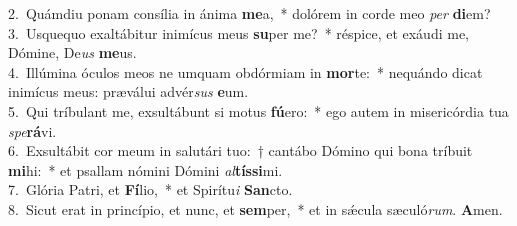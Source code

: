 {2.~}Quámdiu ponam consília in ánima \textbf{me}a,~* dolórem in corde meo \textit{per} \textbf{di}em?\\
{3.~}Usquequo exaltábitur inimícus meus \textbf{su}per me?~* réspice, et exáudi me, Dómine, De\textit{us} \textbf{me}us.\\
{4.~}Illúmina óculos meos ne umquam obdórmiam in \textbf{mor}te:~* nequándo dicat inimícus meus: præválui advér\textit{sus} \textbf{e}um.\\
{5.~}Qui tríbulant me, exsultábunt si motus \textbf{fú}ero:~* ego autem in misericórdia tua \textit{spe}\textbf{rá}vi.\\
{6.~}Exsultábit cor meum in salutári tuo:~† cantábo Dómino qui bona tríbuit \textbf{mi}hi:~* et psallam nómini Dómini \textit{al}\textbf{tís}\textbf{si}mi.\\
{7.~}Glória Patri, et \textbf{Fí}lio,~* et Spirítu\textit{i} \textbf{San}cto.\\
{8.~}Sicut erat in princípio, et nunc, et \textbf{sem}per,~* et in sǽcula sæculó\textit{rum}. \textbf{A}men.\\
